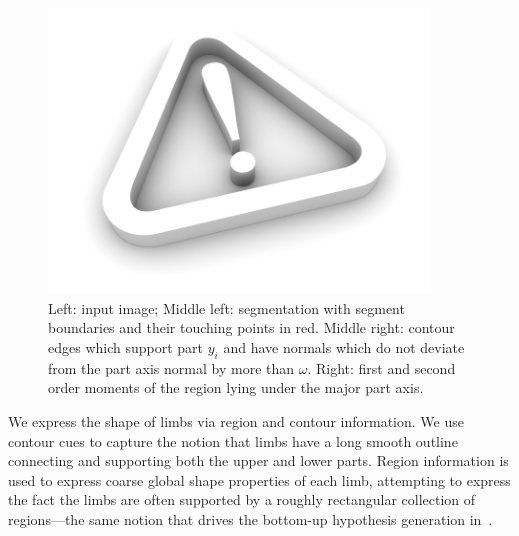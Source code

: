 \begin{figure}[t!]
\begin{center}
\includegraphics[width=0.9\textwidth]{figs/empty.jpg}
\caption{\label{cc_fig} Left: input image; Middle left: segmentation with segment boundaries and their touching points in red. 
Middle right: contour edges which support part $y_i$ and have normals which do not deviate from the part axis normal by more than $\omega$. 
Right: first and second order moments of the region lying under the major part axis.}
\end{center}
\vskip -0.4in
\end{figure}
We express the shape of limbs via region and contour information. We use contour cues to capture the notion that limbs have a long smooth outline connecting and supporting both the upper and lower parts.  Region information is used to express coarse global shape properties of each limb, attempting to express the fact the limbs are often supported by a roughly rectangular collection of regions---the same notion that drives the bottom-up hypothesis generation in~\cite{mori04,Srinivasan07}.

